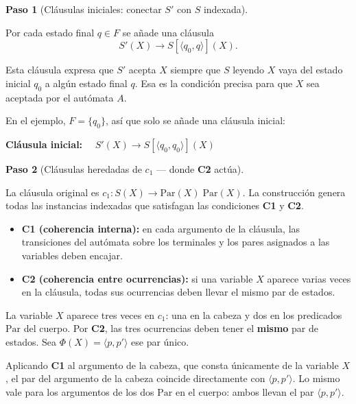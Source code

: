 \documentclass[11pt, letterpaper]{article}
\theoremstyle{definition}
\newtheorem{paso}{Paso}
\newcommand{\pair}[2]{\langle #1, #2 \rangle}
\newcommand{\hl}[1]{\textcolor{red!70!black}{\textbf{#1}}}
\newcommand{\Par}{\mathrm{Par}}
\begin{document}
\begin{paso}[Cláusulas iniciales: conectar $S'$ con $S$ indexada]
\end{paso}

Por cada estado final $q \in F$ se añade una cláusula
\[
S'(X) \to S[\pair{q_0}{q}](X).
\]

Esta cláusula expresa que $S'$ acepta $X$ siempre que $S$ leyendo $X$ vaya del estado inicial $q_0$ a algún estado final $q$. Esa es la condición precisa para que $X$ sea aceptada por el autómata $A$.

En el ejemplo, $F = \{q_0\}$, así que solo se añade una cláusula inicial:

\begin{tcolorbox}[colback=green!10, colframe=green!50!black]
\textbf{Cláusula inicial:} $\quad S'(X) \to S[\pair{q_0}{q_0}](X)$
\end{tcolorbox}

\begin{paso}[Cláusulas heredadas de $c_1$ --- donde \textbf{C2} actúa]
\end{paso}

La cláusula original es $c_1: S(X) \to \Par(X) \; \Par(X)$. La construcción genera todas las instancias indexadas que satisfagan las condiciones \textbf{C1} y \textbf{C2}.

\begin{itemize}
\item \textbf{C1 (coherencia interna):} en cada argumento de la cláusula, las transiciones del autómata sobre los terminales y los pares asignados a las variables deben encajar.
\item \textbf{C2 (coherencia entre ocurrencias):} si una variable $X$ aparece varias veces en la cláusula, todas sus ocurrencias deben llevar el mismo par de estados.
\end{itemize}

La variable $X$ aparece tres veces en $c_1$: una en la cabeza y dos en los predicados $\Par$ del cuerpo. Por \textbf{C2}, las tres ocurrencias deben tener el \hl{mismo} par de estados. Sea $\Phi(X) = \pair{p}{p'}$ ese par único.

Aplicando \textbf{C1} al argumento de la cabeza, que consta únicamente de la variable $X$, el par del argumento de la cabeza coincide directamente con $\pair{p}{p'}$. Lo mismo vale para los argumentos de los dos $\Par$ en el cuerpo: ambos llevan el par $\pair{p}{p'}$.
\end{document}
